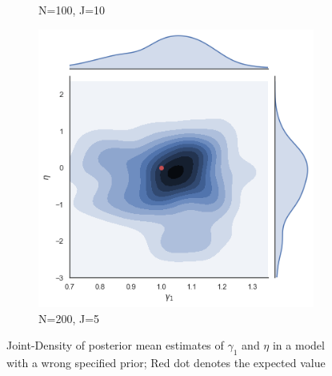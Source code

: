 \begin{figure}[H]
\begin{subfigure}[b]{0.3\linewidth}
    \caption{N=100, J=10}
  \end{subfigure}
  \begin{subfigure}[b]{0.3\linewidth}
    \includegraphics[width=\linewidth]{graphics/jointplot_gamma1eta_smallJ}
    \caption{ N=200, J=5}
  \end{subfigure}
  \caption{Joint-Density of posterior mean estimates of $\gamma_1$ and $\eta$ in a model with a wrong specified prior;
  Red dot denotes the expected value}
  \label{fig:various sample size}
\end{figure}


